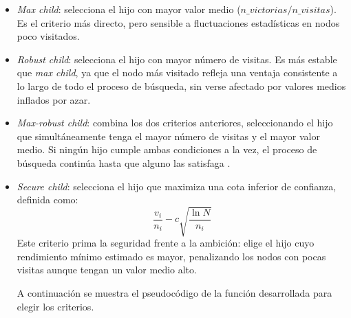 \documentclass[conference,a4paper]{IEEEtran}
\begin{document}
\begin{itemize}
  \item \textit{Max child}: selecciona el hijo con mayor valor medio
  ($n\_victorias / n\_visitas$). Es el criterio más directo, pero sensible a fluctuaciones
  estadísticas en nodos poco visitados.
  \item \textit{Robust child}: selecciona el hijo con mayor número de visitas.
  Es más estable que \textit{max child}, ya que el nodo más visitado refleja
  una ventaja consistente a lo largo de todo el proceso de búsqueda, sin verse afectado por valores medios inflados por azar.
  \item \textit{Max-robust child}: combina los dos criterios anteriores,
  seleccionando el hijo que simultáneamente tenga el mayor número de visitas
  y el mayor valor medio. Si ningún hijo cumple ambas condiciones a la vez,
  el proceso de búsqueda continúa hasta que alguno las satisfaga \cite{b2}.
  \item \textit{Secure child}: selecciona el hijo que maximiza una cota inferior
  de confianza, definida como:
  \begin{equation}
    \frac{v_i}{n_i} - c\sqrt{\frac{\ln N}{n_i}}
    \label{eq:secure}
  \end{equation}
  Este criterio prima la seguridad frente a la ambición: elige el hijo cuyo
  rendimiento mínimo estimado es mayor, penalizando los nodos con pocas visitas
  aunque tengan un valor medio alto.

  A continuación se muestra el pseudocódigo de la función desarrollada para elegir los criterios.


\end{itemize}
\end{document}
